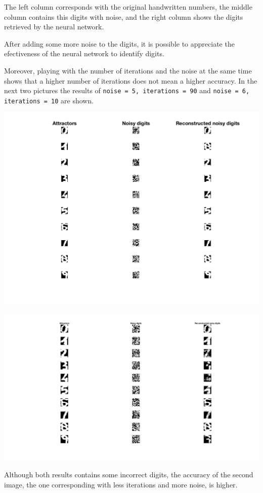 \documentclass[10pt]{article}
\begin{document}
\begin{multicols}{2}
The left column corresponds with the original handwritten numbers, the middle column contains this digits with noise,
and the right column shows the digits retrieved by the neural network.

After adding some more noise to the digits, it is possible to appreciate the efectiveness of the neural network to
identify digits.

Moreover, playing with the number of iterations and the noise at the same time shows that a higher
number of iterations does not mean a higher accuracy. In the next two pictures the results of \texttt{noise = 5, iterations = 90}
and \texttt{noise = 6, iterations = 10} are shown.

\begin{center}
	\includegraphics[width=0.8\linewidth]{img/hop5-90}
\end{center}

\begin{center}
	\includegraphics[width=0.8\linewidth]{img/hop6-10}
\end{center}

Although both results contains some incorrect digits, the accuracy of the second image, the one corresponding
with less iterations and more noise, is higher.


\end{multicols}
\end{document}
